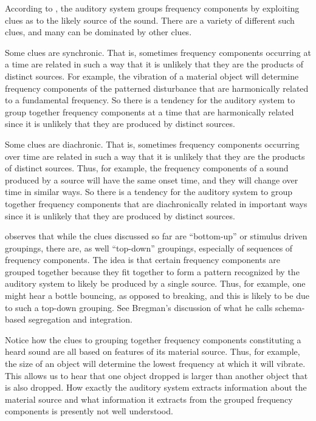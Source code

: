 According to \citet{Nudds:2009sf,Nudds:2010aa}, the auditory system groups frequency components by exploiting clues as to the likely source of the sound. There are a variety of different such clues, and many can be dominated by other clues. 

Some clues are synchronic. That is, sometimes frequency components occurring at a time are related in such a way that it is unlikely that they are the products of distinct sources. For example, the vibration of a material object will determine frequency components of the patterned disturbance that are harmonically related to a fundamental frequency. So there is a tendency for the auditory system to group together frequency components at a time that are harmonically related since it is unlikely that they are produced by distinct sources. 

Some clues are diachronic. That is, sometimes frequency components occurring over time are related in such a way that it is unlikely that they are the products of distinct sources. Thus, for example, the frequency components of a sound produced by a source will have the same onset time, and they will change over time in similar ways. So there is a tendency for the auditory system to group together frequency components that are diachronically related in important ways since it is unlikely that they are produced by distinct sources. 

\citet[74]{Nudds:2009sf} observes that while the clues discussed so far are ``bottom-up'' or stimulus driven groupings, there are, as well ``top-down'' groupings, especially of sequences of frequency components. The idea is that certain frequency components are grouped together because they fit together to form a pattern recognized by the auditory system to likely be produced by a single source. Thus, for example, one might hear a bottle bouncing, as opposed to breaking, and this is likely to be due to such a top-down grouping. See Bregman's \citeyearpar[chapter 4]{Bregman:1990aa} discussion of what he calls schema-based segregation and integration.

Notice how the clues to grouping together frequency components constituting a heard sound are all based on features of its material source. Thus, for example, the size of an  object will determine the lowest frequency at which it will vibrate. This allows us to hear that one object dropped is larger than another object that is also dropped. How exactly the auditory system extracts information about the material source and what information it extracts from the grouped frequency components is presently not well understood. 

